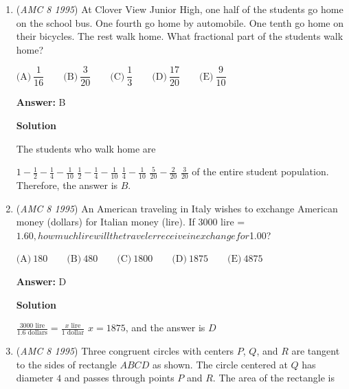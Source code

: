 \begin{enumerate}
 



\textbf{Solution 2}

Let a side of $I$ equal $x$, and let a side of $II$ equal $y$. The perimeter of $I$ is $4x$, and the perimeter of $II$ is $4y$. One side of $III$ has length $x+y$, so the perimeter is $4x+4y$, which just so happens to be the sum of the perimeters of $I$ and $II$, giving us $12+24=36$, or answer $\boxed{C}$.

 


	\item (\textit{AMC 8 1995}) At Clover View Junior High, one half of the students go home on the school bus.  One fourth go home by automobile.  One tenth go home on their bicycles.  The rest walk home.  What fractional part of the students walk home?


 $\text{(A)}\ \dfrac{1}{16} \qquad \text{(B)}\ \dfrac{3}{20} \qquad \text{(C)}\ \dfrac{1}{3} \qquad \text{(D)}\ \dfrac{17}{20} \qquad \text{(E)}\ \dfrac{9}{10}$

 \textbf{Answer: }B



\textbf{Solution}

The students who walk home are

 $1 - \frac{1}{2} - \frac{1}{4} - \frac{1}{10}$
$\frac{1}{2} - \frac{1}{4} - \frac{1}{10}$
$\frac{1}{4} - \frac{1}{10}$
$\frac{5}{20} - \frac{2}{20}$
$\frac{3}{20}$ of the entire student population.  Therefore, the answer is $\boxed{B}$. 

 


	\item (\textit{AMC 8 1995}) An American traveling in Italy wishes to exchange American money (dollars) for Italian money (lire).  If 3000 lire = $1.60, how much lire will the traveler receive in exchange for $1.00?


 $\text{(A)}\ 180 \qquad \text{(B)}\ 480 \qquad \text{(C)}\ 1800 \qquad \text{(D)}\ 1875 \qquad \text{(E)}\ 4875$

 \textbf{Answer: }D



\textbf{Solution}

$\frac{3000 \text{ lire}}{1.6 \text{ dollars}} = \frac{x \text{ lire}}{1 \text{ dollar}}$
$x = 1875$, and the answer is $\boxed{D}$



	\item (\textit{AMC 8 1995}) Three congruent circles with centers $P$, $Q$, and $R$ are tangent to the sides of rectangle $ABCD$ as shown.  The circle centered at $Q$ has diameter $4$ and passes through points $P$ and $R$.  The area of the rectangle is



\end{enumerate}
